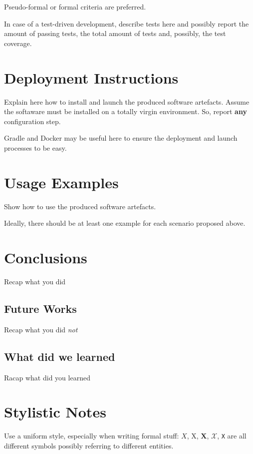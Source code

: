 Pseudo-formal or formal criteria are preferred.

In case of a test-driven development, describe tests here and possibly report the amount of passing tests, the total amount of tests and, possibly, the test coverage.

\section{Deployment Instructions}

Explain here how to install and launch the produced software artefacts.
%
Assume the softaware must be installed on a totally virgin environment.
%
So, report \textbf{any} configuration step.

Gradle and Docker may be useful here to ensure the deployment and launch processes to be easy.

\section{Usage Examples}

Show how to use the produced software artefacts.

Ideally, there should be at least one example for each scenario proposed above.

\section{Conclusions}

Recap what you did

\subsection{Future Works}

Recap what you did \emph{not}

\subsection{What did we learned}

Racap what did you learned

\section*{Stylistic Notes}

Use a uniform style, especially when writing formal stuff: $X$, X, $\mathbf{X}$, $\mathcal{X}$, \texttt{X} are all different symbols possibly referring to different entities.

